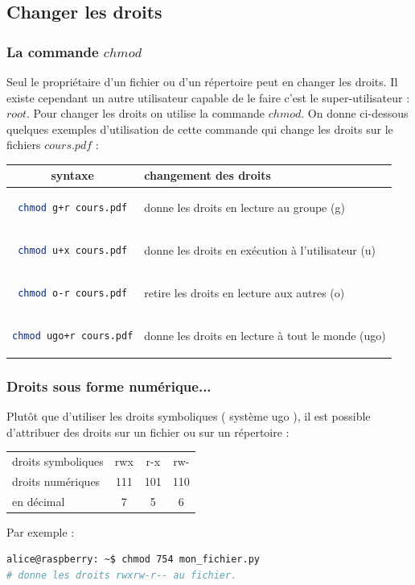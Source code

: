 \documentclass[a4paper,10pt]{article}
\begin{document}
\subsection{Changer les droits}
\subsubsection{La commande $chmod$}
Seul le propriétaire d'un fichier ou d'un répertoire peut en changer les droits. Il existe cependant un autre utilisateur capable de le faire c'est le super-utilisateur : $root$.
 \newline
Pour changer les droits on utilise la commande $chmod$. On donne ci-dessous quelques exemples d'utilisation de cette commande qui change les droits sur le fichiers $cours.pdf$ :
\newline
\begin{tabular}{|c|l|}
	\hline
	syntaxe & changement des droits \\
	\hline
	\begin{lstlisting}[language=sh,]
	chmod g+r cours.pdf
	\end{lstlisting}  & donne les droits en lecture au groupe (g) \\
	\begin{lstlisting}[language=sh,]
	chmod u+x cours.pdf
	\end{lstlisting} & donne les droits en exécution à l'utilisateur (u) \\
	\begin{lstlisting}[language=sh,]
	chmod o-r cours.pdf
	\end{lstlisting} & retire les droits en lecture aux autres (o)\\
		\begin{lstlisting}[language=sh,]
	chmod ugo+r cours.pdf
	\end{lstlisting} & donne les droits en lecture à tout le monde (ugo)\\
	\hline
\end{tabular}
\subsubsection{Droits sous forme numérique...}
Plutôt que d'utiliser les droits symboliques ( système ugo ), il est possible d'attribuer des droits sur un fichier ou sur un répertoire :
\newline
\begin{tabular}{lccc}
	droits symboliques & rwx & r-x & rw-\\
	droits numériques & 111&101&110\\
	en décimal &7&5&6
\end{tabular}
Par exemple :
	\begin{lstlisting}[language=sh, frame = single]
alice@raspberry: ~$ chmod 754 mon_fichier.py
# donne les droits rwxrw-r-- au fichier.
\end{lstlisting}
\end{document}
